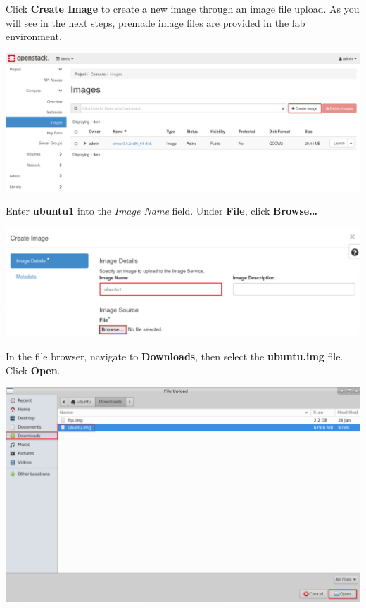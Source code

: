 \documentclass[letterpaper, 12pt]{article}
\begin{document}
\begin{enumerate}
    \begin{labstep}
        Click \textbf{Create Image} to create a new image through an image file upload.
        As you will see in the next steps, premade image files are provided in the lab environment.

        \begin{center}
            \includegraphics[width=\linewidth]{images/part1/step5.png}
        \end{center}
    \end{labstep}

    \begin{labstep}
        Enter \textbf{ubuntu1} into the \textit{Image Name} field.
        Under \textbf{File}, click \textbf{Browse…}

        \begin{center}
            \includegraphics[width=\linewidth]{images/part1/step6.png}
        \end{center}
    \end{labstep}

    \begin{labstep}
        In the file browser, navigate to \textbf{Downloads}, then select the \textbf{ubuntu.img} file.
        Click \textbf{Open}.

        \begin{center}
            \includegraphics[width=\linewidth]{images/part1/step7.png}
        \end{center}
    \end{labstep}


\end{enumerate}
\end{document}
